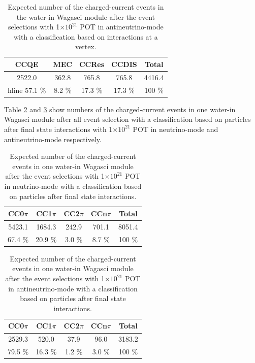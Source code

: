 \begin{table}[htb]
  \begin{center}
    \caption{Expected number of the charged-current events in the water-in Wagasci module after the event selections with 1$\times 10^{21}$ POT in antineutrino-mode with a classification based on interactions at a vertex.}
    \begin{tabular}{cccc|c} \hline
CCQE & MEC & CCRes & CCDIS & Total \\ \hline
2522.0 & 362.8 & 765.8 & 765.8 & 4416.4 \\ hline
57.1 \% & 8.2 \% & 17.3 \% & 17.3 \% & 100 \% \\
\hline
    \end{tabular}
    \label{tab:expected_num_cc_events_antineutrino_beam}
  \end{center}
\end{table}


Table \ref{tab:expected_num_ccfsi_events_neutrino_beam} and \ref{tab:expected_num_ccfsi_events_antineutrino_beam}  show numbers of the charged-current events in one water-in Wagasci module after all event selection with a classification based on particles after final state interactions with 1$\times 10^{21}$ POT in neutrino-mode and antineutrino-mode respectively.

\begin{table}[htb]
  \begin{center}
    \caption{Expected number of the charged-current events in one water-in Wagasci module after the event selections with 1$\times 10^{21}$ POT in neutrino-mode with a classification based on particles after final state interactions.}
    \begin{tabular}{cccc|c} \hline
CC0$\pi$ & CC1$\pi$ & CC2$\pi$ & CCn$\pi$  & Total \\ \hline
5423.1 & 1684.3 & 242.9 & 701.1 & 8051.4 \\ \hline
67.4 \% & 20.9 \% & 3.0 \% & 8.7 \% & 100 \% \\
\hline
    \end{tabular}
    \label{tab:expected_num_ccfsi_events_neutrino_beam}
  \end{center}
\end{table}

\begin{table}[htb]
  \begin{center}
    \caption{Expected number of the charged-current events in one water-in Wagasci module after the event selections with 1$\times 10^{21}$ POT in antineutrino-mode with a classification based on  particles after final state interactions.}
    \begin{tabular}{cccc|c} \hline
CC0$\pi$ & CC1$\pi$ & CC2$\pi$ & CCn$\pi$  & Total \\ \hline
2529.3 & 520.0 & 37.9 & 96.0 & 3183.2 \\ \hline
79.5 \% & 16.3 \% & 1.2 \% & 3.0 \% & 100 \% \\
\hline
    \end{tabular}
    \label{tab:expected_num_ccfsi_events_antineutrino_beam}
  \end{center}
\end{table}


